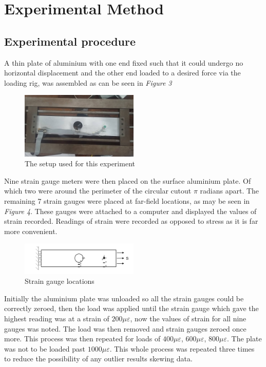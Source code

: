 \documentclass[11pt,twocolumn]{article} %
\begin{document}
\section{Experimental Method}
\subsection{Experimental procedure}
A thin plate of aluminium with one end fixed such that it could undergo no horizontal displacement and the other end loaded to a desired force via the loading rig, was assembled  as can be seen in \textit{Figure 3}
\begin{figure}[!ht]
	\centering
		\includegraphics[width=0.5\textwidth]{Apperatus.png}
	\caption{The setup used for this experiment}
\end{figure} 
Nine strain gauge meters were then placed on the surface aluminium plate. Of which two were around the perimeter of the circular cutout $\pi$ radians apart. The remaining 7 strain gauges were placed at far-field locations, as may be seen in \textit{Figure 4}. These gauges were attached to a computer and displayed the values of strain recorded. Readings of strain were recorded as opposed to stress as it is far more convenient.
\begin{figure}[!ht]
	\centering
		\includegraphics[width=0.5\textwidth]{ComputationalPlate2.png}
	\caption{Strain gauge locations}
\end{figure} 
\par 
Initially the aluminium plate was unloaded so all the strain gauges could be correctly zeroed, then the load was applied until the strain gauge which gave the highest reading was at a strain of $200\mu\varepsilon$, now the values of strain for all nine gauges was noted. The load was then removed and strain gauges zeroed once more. This process was then repeated for loads of $400\mu\varepsilon$, $600\mu\varepsilon$, $800\mu\varepsilon$. The plate was not to be loaded past $1000\mu\varepsilon$. This whole process was repeated three times to reduce the possibility of any outlier results skewing data.
\end{document}
